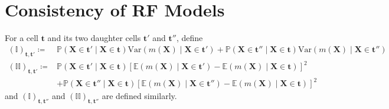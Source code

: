 \documentclass[twoside]{article}
\begin{document}
\section*{Consistency of RF Models}
For a cell $\mathbf{t}$ and its two daughter cells $\mathbf{t}'$ and $\mathbf{t}''$, define 
\begin{align*}
    \left(\mathbb{I}\right)_{\mathbf{t},\mathbf{t}'} \coloneq & \mathbb{P}\left(\mathbf{X}\in \mathbf{t}'\mid \mathbf{X} \in \mathbf{t}\right) \mathrm{Var} \left(m(\mathbf{X}) \mid \mathbf{X}\in\mathbf{t}'\right) + \mathbb{P}\left(\mathbf{X}\in \mathbf{t}''\mid \mathbf{X} \in \mathbf{t}\right)\mathrm{Var} \left(m(\mathbf{X}) \mid \mathbf{X}\in\mathbf{t}''\right) \\
    \left(\mathbb{II}\right)_{\mathbf{t},\mathbf{t}'} \coloneq & \mathbb{P}\left(\mathbf{X}\in \mathbf{t}'\mid \mathbf{X} \in \mathbf{t}\right) \left[\mathbb{E}(m(\mathbf{X})\mid \mathbf{X}\in\mathbf{t}') - \mathbb{E}(m(\mathbf{X})\mid \mathbf{X}\in \mathbf{t})\right]^2\\
    &+ \mathbb{P}\left(\mathbf{X}\in \mathbf{t}''\mid \mathbf{X} \in \mathbf{t}\right) \left[\mathbb{E}(m(\mathbf{X})\mid \mathbf{X}\in\mathbf{t}'') - \mathbb{E}(m(\mathbf{X})\mid \mathbf{X}\in \mathbf{t})\right]^2
\end{align*}
and $\left( \mathbb{I} \right)_{\mathbf{t,t}''}$ and $\left(\mathbb{II}\right)_{\mathbf{t,t}''}$ are defined similarly.
\end{document}
